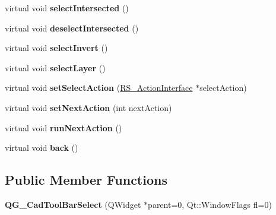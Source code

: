 \begin{DoxyCompactItemize}
\item 
\hypertarget{classQG__CadToolBarSelect_acb50d1a5b502a5af1714bfa0116d2149}{virtual void {\bfseries select\-Intersected} ()}\label{classQG__CadToolBarSelect_acb50d1a5b502a5af1714bfa0116d2149}

\item 
\hypertarget{classQG__CadToolBarSelect_a705e35957e06f41dfb83fd5587d83969}{virtual void {\bfseries deselect\-Intersected} ()}\label{classQG__CadToolBarSelect_a705e35957e06f41dfb83fd5587d83969}

\item 
\hypertarget{classQG__CadToolBarSelect_acfa5bcebb8aeb6a6e4805441de6cbc19}{virtual void {\bfseries select\-Invert} ()}\label{classQG__CadToolBarSelect_acfa5bcebb8aeb6a6e4805441de6cbc19}

\item 
\hypertarget{classQG__CadToolBarSelect_a9ec815571fad60abc06b278707fbc574}{virtual void {\bfseries select\-Layer} ()}\label{classQG__CadToolBarSelect_a9ec815571fad60abc06b278707fbc574}

\item 
\hypertarget{classQG__CadToolBarSelect_a6a36605d001a0e6ff9ddbb51f1acb54a}{virtual void {\bfseries set\-Select\-Action} (\hyperlink{classRS__ActionInterface}{R\-S\-\_\-\-Action\-Interface} $\ast$select\-Action)}\label{classQG__CadToolBarSelect_a6a36605d001a0e6ff9ddbb51f1acb54a}

\item 
\hypertarget{classQG__CadToolBarSelect_ac907a743dad116bfb93df02719a64585}{virtual void {\bfseries set\-Next\-Action} (int next\-Action)}\label{classQG__CadToolBarSelect_ac907a743dad116bfb93df02719a64585}

\item 
\hypertarget{classQG__CadToolBarSelect_ada58cdd0235d60602afd917b09a7b157}{virtual void {\bfseries run\-Next\-Action} ()}\label{classQG__CadToolBarSelect_ada58cdd0235d60602afd917b09a7b157}

\item 
\hypertarget{classQG__CadToolBarSelect_a956560d52fc5994fbcbd2a22ede08740}{virtual void {\bfseries back} ()}\label{classQG__CadToolBarSelect_a956560d52fc5994fbcbd2a22ede08740}

\end{DoxyCompactItemize}
\subsection*{Public Member Functions}
\begin{DoxyCompactItemize}
\item 
\hypertarget{classQG__CadToolBarSelect_ac93c2eb15a227b3aa0d89d58312517a7}{{\bfseries Q\-G\-\_\-\-Cad\-Tool\-Bar\-Select} (Q\-Widget $\ast$parent=0, Qt\-::\-Window\-Flags fl=0)}\label{classQG__CadToolBarSelect_ac93c2eb15a227b3aa0d89d58312517a7}

\end{DoxyCompactItemize}
